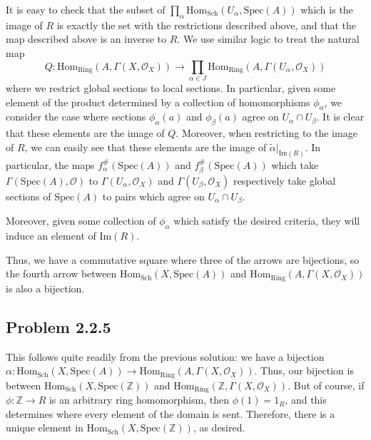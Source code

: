 \documentclass[aps,pra,showpacs,notitlepage,onecolumn,superscriptaddress,nofootinbib]{revtex4-1}
\theoremstyle{definition}
\begin{document}
  It is easy to check that the subset of $\prod_{\alpha} \text{Hom}_{\text{Sch}}(U_{\alpha}, \text{Spec}(A))$ which is the image of $R$ is exactly the set with the restrictions described above, and that the map
  described above is an inverse to $R$. We use similar logic to treat the natural map
  \begin{equation}
    Q : \text{Hom}_{\text{Ring}}(A, \Gamma(X, \mathcal{O}_X)) \rightarrow \displaystyle\prod_{\alpha \in J} \text{Hom}_{\text{Ring}}(A, \Gamma(U_{\alpha}, \mathcal{O}_X))
    \end{equation}
  where we restrict global sections to local sections. In particular, given some element of the product determined by a collection of homomorphisms $\phi_{\alpha}$, we consider the case
  where sections $\phi_{\alpha}(a)$ and $\phi_{\beta}(a)$ agree on $U_{\alpha} \cap U_{\beta}$. It is clear that these elements are the image of $Q$. Moreover, when restricting to the image of
  $R$, we can easily see that these elements are the image of $\widetilde{\alpha}|_{\text{Im}(R)}$. In particular, the maps $f_{\alpha}^{\#}(\text{Spec}(A))$ and $f_{\beta}^{\#}(\text{Spec}(A))$
  which take $\Gamma(\text{Spec}(A), \mathcal{O})$ to $\Gamma(U_{\alpha}, \mathcal{O}_X)$ and $\Gamma(U_{\beta}, \mathcal{O}_X)$ respectively take global sections of $\text{Spec}(A)$ to pairs
  which agree on $U_{\alpha} \cap U_{\beta}$.

  Moreover, given some collection of $\phi_{\alpha}$ which satisfy the desired criteria, they will induce an element of $\text{Im}(R)$.

  Thus, we have a commutative square where three of the arrows are bijections, so the fourth arrow between $\text{Hom}_{\text{Sch}}(X, \text{Spec}(A))$ and $\text{Hom}_{\text{Ring}}(A, \Gamma(X, \mathcal{O}_X))$ is also a
  bijection.

\subsection{Problem 2.2.5}

\noindent This follows quite readily from the previous solution: we have a bijection $\alpha : \text{Hom}_{\text{Sch}}(X, \text{Spec}(A)) \rightarrow \text{Hom}_{\text{Ring}}(A, \Gamma(X, \mathcal{O}_X))$. Thus,
  our bijection is between $\text{Hom}_{\text{Sch}}(X, \text{Spec}(\mathbb{Z}))$ and $\text{Hom}_{\text{Ring}}(\mathbb{Z}, \Gamma(X, \mathcal{O}_X))$. But of course, if $\phi : \mathbb{Z} \rightarrow R$ is an
  arbitrary ring homomorphism, then $\phi(1) = 1_R$, and this determines where every element of the domain is sent. Therefore, there is a unique element in $\text{Hom}_{\text{Sch}}(X, \text{Spec}(\mathbb{Z}))$, as desired.
\end{document}
